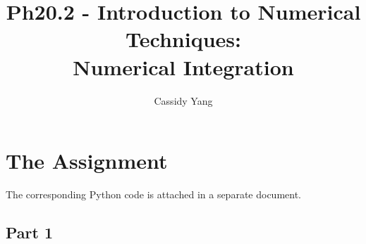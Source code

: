 \documentclass{article}
\begin{document}
\title{Ph20.2 - Introduction to Numerical Techniques:\\ Numerical Integration}
\author{Cassidy Yang}
\maketitle
\pagestyle{fancy}

\section{The Assignment}

The corresponding Python code is attached in a separate document.

\subsection{Part 1}
\end{document}

